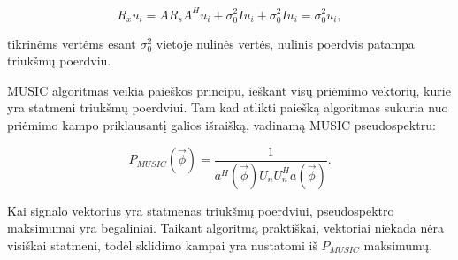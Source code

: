 \documentclass[main.tex]{subfiles}
\begin{document}
\begin{equation}
    R_xu_i=AR_sA^Hu_i+\sigma^2_0Iu_i+\sigma^2_0Iu_i=\sigma^2_0u_i,
\end{equation}

\noindent tikrinėms vertėms esant $\sigma^2_0$ vietoje nulinės vertės, nulinis
poerdvis patampa triukšmų poerdviu.

MUSIC algoritmas veikia paieškos principu, ieškant visų priėmimo vektorių, kurie
yra statmeni triukšmų poerdviui. Tam kad atlikti paiešką algoritmas sukuria
nuo priėmimo kampo priklausantį galios išraišką, vadinamą MUSIC pseudospektru:

\begin{equation}
    P_{MUSIC}(\overrightarrow{\phi}) = \frac{1}{a^H(\overrightarrow{\phi})U_nU_n^Ha(\overrightarrow{\phi})}.
\end{equation}

\noindent Kai signalo vektorius yra statmenas triukšmų poerdviui, pseudospektro maksimumai
yra begaliniai. Taikant algoritmą praktiškai, vektoriai niekada nėra visiškai statmeni,
todėl sklidimo kampai yra nustatomi iš $P_{MUSIC}$ maksimumų.
\end{document}
